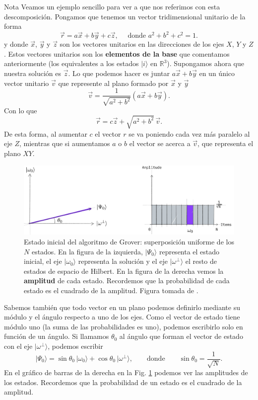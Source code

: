\documentclass[a4paper,11pt]{article} %
\numberwithin{equation}{section}
\def\lp{\left(}
\def\rp{\right)}
\begin{document}
	\begin{mybox}{Nota}
	Veamos un ejemplo sencillo para ver a que nos referimos con esta descomposición. Pongamos que 
	tenemos un vector tridimensional unitario de la forma
	$$ \vec{r} = a \vec{x} + b \vec{y} + c \vec{z}, \quad \text{ donde } a^2+b^2+c^2 = 1 .$$
	y donde $\vec{x}$, $\vec{y}$ y $\vec{z}$ son los vectores unitarios en las direcciones de los ejes
	$X$, $Y$ y $Z$. Estos vectores unitarios son los \textbf{elementos de la base} que comentamos 
	anteriormente (los equivalentes a los estados $|i\rangle$ en $\mathbb{R}^3$). Supongamos ahora que
	nuestra solución es $\vec{z}$. Lo que podemos hacer es juntar $a \vec{x} + b \vec{y}$ en un único
	vector unitario $\vec{v}$ que represente al plano formado por $\vec{x}$ y $\vec{y}$
	$$ \vec{v} = \frac{1}{\sqrt{a^2+b^2}} \lp a \vec{x} + b \vec{y} \rp. $$
	Con lo que
	$$ \vec{r} = c \vec{z} + \sqrt{a^2+b^2} \, \vec{v}. $$
	De esta forma, al aumentar $c$ el vector $r$ se va poniendo cada vez más paralelo
	al eje $Z$, mientras que si aumentamos $a$ o $b$ el vector se acerca a $\vec{v}$, que representa el 
	plano $XY$.
	
	\end{mybox}


	\begin{figure}[t]
	\centering 
	\includegraphics[width=0.85\linewidth]{Figuras/Fig_geo_1.png}
	\caption{Estado inicial del algoritmo de Grover: superposición uniforme de los $N$ estados. 
	En la figura de la izquierda, $| \Psi_0 \rangle$ representa el estado inicial, 
	el eje $|\omega_0 \rangle $ representa la solución y el eje $| \omega^{\perp} \rangle$ el resto de estados 
	de espacio de Hilbert. En la figura de la derecha vemos la \textbf{amplitud} de cada estado. 
	Recordemos que la probabilidad de cada estado es el cuadrado de la amplitud. Figura tomada 
	de \cite{Qiskit-Grover}.}
	\label{Fig_geo_1}
	\end{figure}

Sabemos también que todo vector en un plano podemos definirlo mediante su módulo y el ángulo respecto a uno de los ejes. Como el vector de estado tiene módulo uno (la suma de las probabilidades es uno), podemos escribirlo solo en función de un ángulo. Si llamamos $\theta_0$ al ángulo que forman el vector de estado con el eje $| \omega^{\perp} \rangle$, podemos escribir
\begin{equation} \label{ec_geo_theta}
| \Psi_0 \rangle = \sin \theta_0 \, |\omega_0 \rangle + \cos \theta_0 \, | \omega^{\perp} \rangle, \qquad \text{donde} \qquad  \boxed{\sin \theta_0 = \frac{1}{\sqrt{N}}}.
\end{equation}
En el gráfico de barras de la derecha en la Fig. \ref{Fig_geo_1} podemos ver las amplitudes de los estados. Recordemos que la probabilidad de un estado es el cuadrado de la amplitud.
\end{document}
